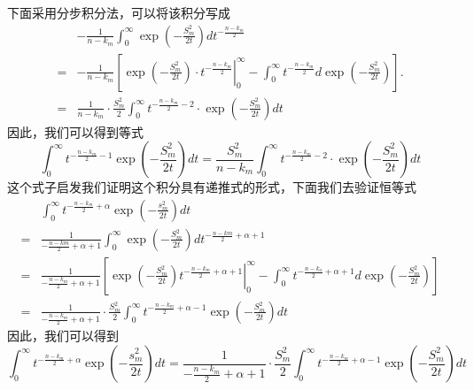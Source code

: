 \documentclass[12pt]{article} %
\begin{document}
	下面采用分步积分法，可以将该积分写成
	\begin{equation*}
		\begin{aligned}
			&-\frac{1}{n-k_{m}} \int_{0}^{\infty} \exp \left(-\frac{S_{m}^{2}}{2 t}\right) d t^{-\frac{n-k_{m}}{2}} \\
			=&-\frac{1}{n-k_{m}}\left[\left.\exp \left(-\frac{S_{m}^{2}}{2 t}\right) \cdot t^{-\frac{n-k_{m}}{2}}\right|_{0} ^{\infty}-\int_{0}^{\infty} t^{-\frac{n-k_{m}}{2}} d \exp \left(-\frac{S_{m}^{2}}{2 t}\right)\right].\\
			=& \frac{1}{n-k_{m}} \cdot \frac{S_{m}^{2}}{2} \int_{0}^{\infty} t^{-\frac{n-k_{m}}{2}-2} \cdot \exp \left(-\frac{S_{m}^{2}}{2 t}\right) d t
		\end{aligned}
	\end{equation*}
	因此，我们可以得到等式
	\begin{equation*}
		\int_{0}^{\infty} t^{-\frac{n-k_{m}}{2}-1} \exp \left(-\frac{S_{m}^{2}}{2 t}\right) d t = \frac{S_{m}^{2}}{n-k_{m}} \int_{0}^{\infty} t^{-\frac{n-k_{m}}{2}-2} \cdot \exp \left(-\frac{S_{m}^{2}}{2 t}\right) d t
	\end{equation*}
	这个式子启发我们证明这个积分具有递推式的形式，下面我们去验证恒等式
	\begin{equation*}
		\begin{aligned}
			& \int_{0}^{\infty} t^{-\frac{n-k_{m}}{2}+\alpha} \exp \left(-\frac{s_{m}^{2}}{2 t}\right) d t \\
			=&\frac{1}{-\frac{n-k m}{2}+\alpha+1} \int_{0}^{\infty} \exp \left(-\frac{S_{m}^{2}}{2 t}\right) d t^{-\frac{n-k m}{2}+\alpha+1} \\
			=& \frac{1}{-\frac{n-k_{m}}{2}+\alpha+1}\left[\left.\exp \left(-\frac{S_{m}^{2}}{2 t}\right) t^{-\frac{n-k_{m}}{2}+\alpha+1}\right|_{0} ^{\infty}-\int_{0}^{\infty} t^{-\frac{n-k_{a}}{2}+\alpha+1} d \exp \left(-\frac{S_{m}^{2}}{2 t}\right)\right] \\
			=& \frac{1}{-\frac{n-k_{m}}{2}+\alpha+1} \cdot \frac{S_{m}^{2}}{2} \int_{0}^{\infty} t^{-\frac{n-k_{m}}{2}+\alpha-1} \exp \left(-\frac{S_{m}^{2}}{2 t}\right) d t
		\end{aligned}
	\end{equation*}
	因此，我们可以得到
	\begin{equation*}
		\int_{0}^{\infty} t^{-\frac{n-k_{m}}{2}+\alpha} \exp \left(-\frac{s_{m}^{2}}{2 t}\right) d t = \frac{1}{-\frac{n-k_{m}}{2}+\alpha+1} \cdot \frac{S_{m}^{2}}{2} \int_{0}^{\infty} t^{-\frac{n-k_{m}}{2}+\alpha-1} \exp \left(-\frac{S_{m}^{2}}{2 t}\right) d t
	\end{equation*}
\end{document}
